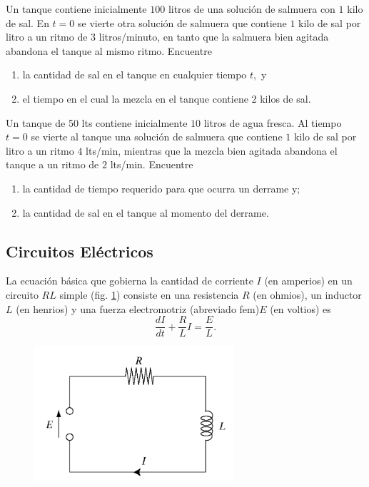 	\begin{problema}
		\label{bron:exmp:7.17}
		Un tanque contiene inicialmente $100$ litros de una solución de salmuera con $1$ kilo de sal. En $t=0$ se vierte otra solución de salmuera que contiene $1$ kilo de sal por litro a un ritmo de $3$ litros/minuto, en tanto que la salmuera bien agitada abandona el tanque al mismo ritmo. Encuentre
		\begin{enumerate}
			\item la cantidad de sal en el tanque en cualquier tiempo $t,$ y
			\item el tiempo en el cual la mezcla en el tanque contiene 2 kilos de sal.
		\end{enumerate}
		
	\end{problema}
	



	\begin{problema}
		Un tanque de 50 lts contiene inicialmente $10$ litros de agua fresca. Al tiempo $t=0$ se vierte al tanque una solución de salmuera que contiene $1$ kilo de sal por litro a un ritmo $4$ lts/min, mientras que la mezcla bien agitada abandona el tanque a un ritmo de $2$ lts/min. Encuentre
		\begin{enumerate}
			\item la cantidad de tiempo requerido para que ocurra un derrame y;
			\item la cantidad de sal en el tanque al momento del derrame.
		\end{enumerate}
		
	\end{problema}
	



\subsection{Circuitos Eléctricos}


	La ecuación básica que gobierna la cantidad de corriente $I$ (en amperios) en un circuito $RL$ simple (fig. \ref{fig:020502}) consiste en una resistencia $R$ (en ohmios), un inductor $L$ (en henrios) y una fuerza electromotriz (abreviado fem)$E$ (en voltios) es
	\begin{equation}
		\label{bron:7.9}
		\dfrac{dI}{dt}+\dfrac{R}{L}I=\dfrac{E}{L}.
	\end{equation}
	



	\begin{figure}
		\centering
		\includegraphics[height=5cm,keepaspectratio=true]{./edo/img020502.png}
		\label{fig:020502}
	\end{figure}
	



